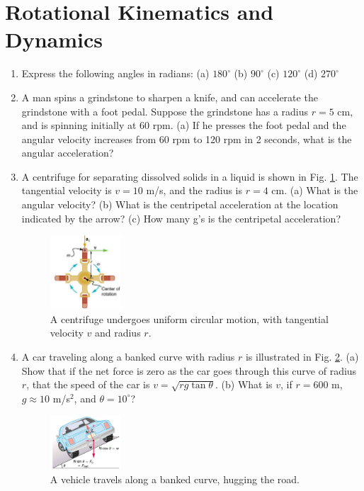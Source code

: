 \documentclass[10pt]{article}
\begin{document}
\maketitle
\small
\section{Rotational Kinematics and Dynamics}
\begin{enumerate}
\item Express the following angles in radians: (a) $180^{\circ}$ (b) $90^{\circ}$ (c) $120^{\circ}$ (d) $270^{\circ}$ \\ \vspace{1cm}
\item A man spins a grindstone to sharpen a knife, and can accelerate the grindstone with a foot pedal.  Suppose the grindstone has a radius $r=5$ cm, and is spinning initially at 60 rpm.  (a) If he presses the foot pedal and the angular velocity increases from 60 rpm to 120 rpm in 2 seconds, what is the angular acceleration? \\ \vspace{1cm}
\item A centrifuge for separating dissolved solids in a liquid is shown in Fig. \ref{fig:cent}.  The tangential velocity is $v=10$ m/s, and the radius is $r=4$ cm.  (a) What is the angular velocity? (b) What is the centripetal acceleration at the location indicated by the arrow? (c) How many g's is the centripetal acceleration?
\begin{figure}[ht]
\centering
\includegraphics[width=0.25\textwidth]{figures/centrifuge.png}
\caption{\label{fig:cent} A centrifuge undergoes uniform circular motion, with tangential velocity $v$ and radius $r$.}
\end{figure}
\item A car traveling along a banked curve with radius $r$ is illustrated in Fig. \ref{fig:car}.  (a) Show that if the net force is zero as the car goes through this curve of radius $r$, that the speed of the car is $v = \sqrt{rg\tan\theta}$. (b) What is $v$, if $r=600$ m, $g\approx 10$ m/s$^2$, and $\theta = 10^{\circ}$?
\begin{figure}[ht]
\centering
\includegraphics[width=0.25\textwidth]{figures/car.png}
\caption{\label{fig:car} A vehicle travels along a banked curve, hugging the road.}
\end{figure}
\end{enumerate}
\clearpage
\end{document}

